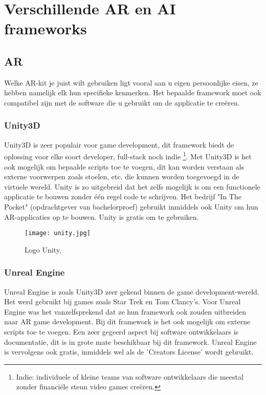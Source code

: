 \section{Verschillende AR en AI frameworks}

\subsection{AR}
Welke AR-kit je juist wilt gebruiken ligt vooral aan u eigen persoonlijke eisen, ze hebben namelijk elk hun specifieke kenmerken. Het bepaalde framework moet ook compatibel zijn met de software die u gebruikt om de applicatie te creëren.
\subsubsection{Unity3D}
Unity3D is zeer populair voor game development, dit framework biedt de oplossing voor elke soort developer, full-stack noch indie \footnote{Indie: individuele of kleine teams van software ontwikkelaars die meestal zonder financiële steun video games creëren.}. Met Unity3D is het ook mogelijk om bepaalde scripts toe te voegen, dit kan worden verstaan als externe voorwerpen zoals stoelen, etc. die  kunnen worden toegevoegd in de virtuele wereld. Unity is zo uitgebreid dat het zelfs mogelijk is om een functionele applicatie te bouwen zonder één regel code te schrijven. Het bedrijf "In The Pocket" (opdrachtgever van bachelorproef) gebruikt inmiddels ook Unity om hun AR-applicaties op te bouwen. Unity is gratis om te gebruiken. \autocite{Arshed2018}

\begin{figure}[H]
	\centering
	\texttt{[image: unity.jpg]}
	\caption{Logo Unity, \autocite{Unity2019}}
\end{figure}

\subsubsection{Unreal Engine}
Unreal Engine is zoals Unity3D zeer gekend binnen de game development-wereld. Het werd gebruikt bij games zoals Star Trek en Tom Clancy's. Voor Unreal Engine was het vanzelfsprekend dat ze hun framework ook zouden uitbreiden naar 	AR game development. Bij dit framework is het ook mogelijk om externe scripts toe te voegen. Een zeer gegeerd aspect bij software ontwikkelaars is documentatie, dit is in grote mate beschikbaar bij dit framework. Unreal Engine is vervolgens ook gratis, inmiddels wel als de 'Creators License'  wordt gebruikt.  \autocite{Arshed2018}

